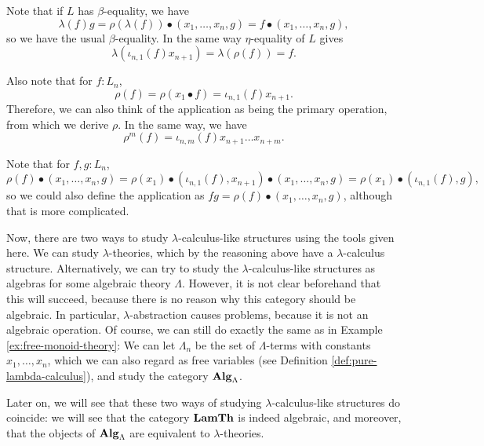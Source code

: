 \begin{remark}
  Note that if $ L $ has $ \beta $-equality, we have
  \[ \lambda(f) g = \rho(\lambda(f)) \bullet (x_1, \dots, x_n, g) = f \bullet (x_1, \dots, x_n, g), \]
  so we have the usual $ \beta $-equality. In the same way $ \eta $-equality of $ L $ gives
  \[ \lambda(\iota_{n, 1}(f) x_{n + 1}) = \lambda(\rho(f)) = f. \]
\end{remark}
\begin{remark}
  Also note that for $ f: L_n $,
  \[ \rho(f) = \rho(x_1 \bullet f) = \iota_{n, 1}(f) x_{n + 1}. \]
  Therefore, we can also think of the application as being the primary operation, from which we derive $ \rho $. In the same way, we have
  \[ \rho^m(f) = \iota_{n, m}(f) x_{n + 1} \dots x_{n + m}. \]
\end{remark}
\begin{remark}
  Note that for $ f, g : L_n $,
  \[
    \rho(f) \bullet (x_1, \dots, x_n, g)
    = \rho(x_1) \bullet (\iota_{n, 1}(f), x_{n + 1}) \bullet (x_1, \dots, x_n, g)
    = \rho(x_1) \bullet (\iota_{n, 1}(f), g),
  \]
  so we could also define the application as $ f g = \rho(f) \bullet (x_1, \dots, x_n, g) $, although that is more complicated.
\end{remark}

\begin{remark}\label{rem:lambda-theory-or-algebra}
  Now, there are two ways to study $ \lambda $-calculus-like structures using the tools given here. We can study $ \lambda $-theories, which by the reasoning above have a $ \lambda $-calculus structure. Alternatively, we can try to study the $ \lambda $-calculus-like structures as algebras for some algebraic theory $ \Lambda $. However, it is not clear beforehand that this will succeed, because there is no reason why this category should be algebraic. In particular, $ \lambda $-abstraction causes problems, because it is not an algebraic operation. Of course, we can still do exactly the same as in Example \ref{ex:free-monoid-theory}: We can let $ \Lambda_n $ be the set of $ \Lambda $-terms with constants $ x_1, \dots, x_n $, which we can also regard as free variables (see Definition \ref{def:pure-lambda-calculus}), and study the category $ \mathbf{Alg}_{\Lambda} $.

  Later on, we will see that these two ways of studying $ \lambda $-calculus-like structures do coincide: we will see that the category $ \mathbf{LamTh} $ is indeed algebraic, and moreover, that the objects of $ \mathbf{Alg}_{\Lambda} $ are equivalent to $ \lambda $-theories.
\end{remark}


